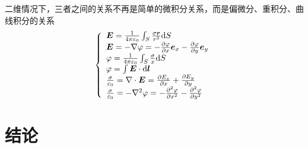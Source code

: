 \documentclass[UTF8,a4paper,10pt]{ctexart}
\begin{document}
\begin{multicols}{2}
            二维情况下，三者之间的关系不再是简单的微积分关系，而是偏微分、重积分、曲线积分的关系
            \begin{equation}
                \left\{\begin{array}{l}
                    \bm{E} = \frac{1}{4\pi\varepsilon_0}\int_S\frac{\sigma\bm{r}}{r^3}{\rm d}S\\
                    \bm{E} = -\nabla\varphi = -\frac{\partial\varphi}{\partial x}\bm{e}_x - \frac{\partial\varphi}{\partial y}\bm{e}_y\\
                    \varphi = \frac{1}{4\pi\varepsilon_0}\int_S\frac{\sigma}{x}{\rm d}S\\
                    \varphi = \int\bm{E}\cdot{\rm d}\bm{l}\\
                    \frac{\sigma}{\varepsilon_0} = \nabla\cdot\bm{E} = \frac{\partial E_x}{\partial x} + \frac{\partial E_y}{\partial y}\\
                    \frac{\sigma}{\varepsilon_0} = -\nabla^2\varphi = -\frac{\partial^2\varphi}{\partial x^2} - \frac{\partial^2\varphi}{\partial y^2}
                \end{array}\right.
            \end{equation}

    \section{结论}
\end{multicols}
\end{document}
